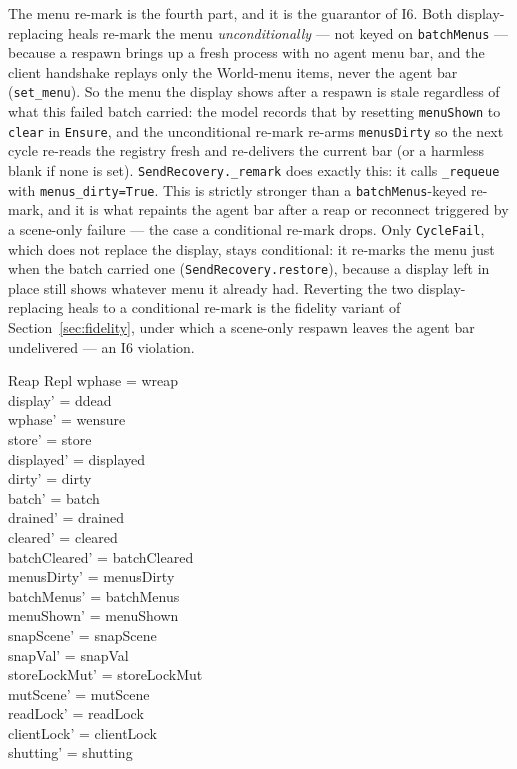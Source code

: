 \documentclass[a4paper,10pt,fleqn]{article}
\begin{document}
The menu re-mark is the fourth part, and it is the guarantor of I6.  Both
display-replacing heals re-mark the menu \emph{unconditionally} --- not keyed
on \texttt{batchMenus} --- because a respawn brings up a fresh process with no
agent menu bar, and the client handshake replays only the World-menu items,
never the agent bar (\texttt{set\_menu}).  So the menu the display shows after
a respawn is stale regardless of what this failed batch carried: the model
records that by resetting \texttt{menuShown} to \texttt{clear} in
\texttt{Ensure}, and the unconditional re-mark re-arms \texttt{menusDirty} so
the next cycle re-reads the registry fresh and re-delivers the current bar (or
a harmless blank if none is set).  \texttt{SendRecovery.\_remark} does exactly
this: it calls \texttt{\_requeue} with \texttt{menus\_dirty=True}.  This is
strictly stronger than a \texttt{batchMenus}-keyed re-mark, and it is what
repaints the agent bar after a reap or reconnect triggered by a scene-only
failure --- the case a conditional re-mark drops.  Only \texttt{CycleFail},
which does not replace the display, stays conditional: it re-marks the menu
just when the batch carried one (\texttt{SendRecovery.restore}), because a
display left in place still shows whatever menu it already had.  Reverting the
two display-replacing heals to a conditional re-mark is the fidelity variant of
Section~\ref{sec:fidelity}, under which a scene-only respawn leaves the agent
bar undelivered --- an I6 violation.

\begin{schema}{Reap}
  \Delta Repl
\where
  wphase = wreap \\
  display' = ddead \\
  wphase' = wensure \\
  store' = store \\
  displayed' = displayed \\
  dirty' = dirty \\
  batch' = batch \\
  drained' = drained \\
  cleared' = cleared \\
  batchCleared' = batchCleared \\
  menusDirty' = menusDirty \\
  batchMenus' = batchMenus \\
  menuShown' = menuShown \\
  snapScene' = snapScene \\
  snapVal' = snapVal \\
  storeLockMut' = storeLockMut \\
  mutScene' = mutScene \\
  readLock' = readLock \\
  clientLock' = clientLock \\
  shutting' = shutting
\end{schema}
\end{document}
